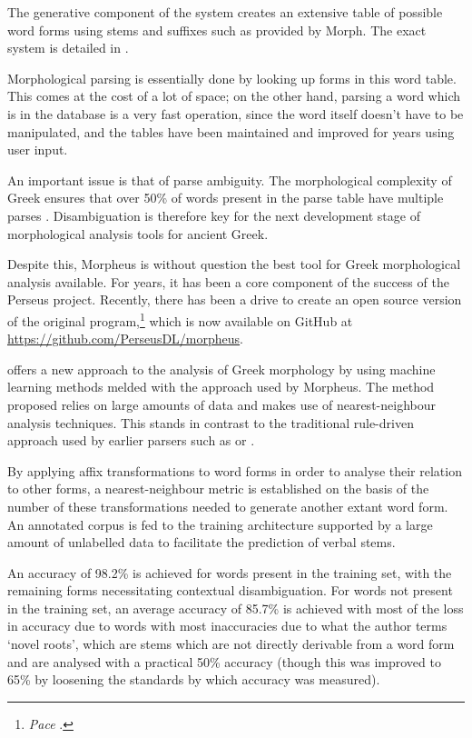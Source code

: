 The generative component of the system creates an extensive table of
possible word forms using stems and suffixes such as provided by
Morph. The exact system is detailed in \cite{crane1991generating}.

Morphological parsing is essentially done by looking up forms in this
word table. This comes at the cost of a lot of space; on the other
hand, parsing a word which is in the database is a very fast
operation, since the word itself doesn't have to be manipulated, and
the tables have been maintained and improved for years using
user input.

An important issue is that of parse ambiguity. The morphological
complexity of Greek ensures that over 50\% of words present in the
parse table have multiple parses \cite{dik2008}. Disambiguation is
therefore key for the next development stage of morphological analysis
tools for ancient Greek.

Despite this, Morpheus is without question the best tool for Greek
morphological analysis available. For years, it has been a core
component of the success of the Perseus project. Recently, there has
been a drive to create an open source version of the original
program,\footnote{\textit{Pace} \cite{blackwell2009}.} which is now
available on GitHub at \url{https://github.com/PerseusDL/morpheus}.

\cite{lee2008nearest} offers a new approach to the analysis of Greek
morphology by using machine learning methods melded with the approach
used by Morpheus. The method proposed relies on large amounts of data
and makes use of nearest-neighbour analysis techniques. This stands in
contrast to the traditional rule-driven approach used by earlier
parsers such as \cite{packard1973computer} or
\cite{crane1991generating}.

By applying affix transformations to word forms in order to analyse
their relation to other forms, a nearest-neighbour metric is
established on the basis of the number of these transformations needed
to generate another extant word form. An annotated corpus is fed to
the training architecture supported by a large amount of unlabelled data to
facilitate the prediction of verbal stems.

An accuracy of 98.2\% is achieved for words present in the training
set, with the remaining forms necessitating contextual
disambiguation. For words not present in the training set, an average
accuracy of 85.7\% is achieved with most of the loss in accuracy due
to words with most inaccuracies due to what the author terms `novel
roots', which are stems which are not directly derivable from a word
form and are analysed with a practical 50\% accuracy (though this was
improved to 65\% by loosening the standards by which accuracy was
measured).

